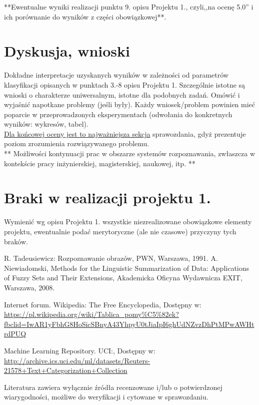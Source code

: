 \documentclass{classrep}
\begin{document}
{**Ewentualne wyniki realizacji punktu 9. opisu Projektu 1., czyli,,na ocenę 5.0'' i ich porównanie do wyników z
części obowiązkowej**.}\\



\section{Dyskusja, wnioski}
Dokładne interpretacje uzyskanych wyników w zależności od parametrów klasyfikacji
opisanych w punktach 3.-8 opisu Projektu 1. 
Szczególnie istotne są wnioski o charakterze uniwersalnym, istotne dla podobnych zadań. 
Omówić i wyjaśnić napotkane problemy (jeśli były). Każdy wniosek/problem powinien mieć poparcie
w przeprowadzonych eksperymentach (odwołania do konkretnych wyników: wykresów,
tabel). \\
\underline{Dla końcowej oceny jest to najważniejsza sekcja} sprawozdania, gdyż prezentuje poziom
zrozumienia rozwiązywanego problemu.\\

** Możliwości kontynuacji prac w obszarze systemów rozpoznawania, zwłaszcza w kontekście pracy inżynierskiej,
magisterskiej, naukowej, itp. **\\



\section{Braki w realizacji projektu 1.}
Wymienić wg opisu Projektu 1. wszystkie niezrealizowane obowiązkowe elementy projektu, ewentualnie
podać merytoryczne (ale nie czasowe) przyczyny tych braków. 


\begin{thebibliography}{0}
 R. Tadeusiewicz: Rozpoznawanie obrazów, PWN, Warszawa, 1991.  
 A. Niewiadomski, Methods for the Linguistic Summarization of Data: Applications of Fuzzy Sets and Their Extensions, Akademicka Oficyna Wydawnicza EXIT, Warszawa, 2008.

 Internet forum. Wikipedia: The Free Encyclopedia, Dostępny w: \url{https://pl.wikipedia.org/wiki/Tablica_pomy%C5%82ek?fbclid=IwAR1yFbhG8HoSicSBnyA43YhpyU0tJiaIpI6ghUdNZvzDhPtMPwAWHtrdPUQ}

 Machine Learning Repository. UCI:, Dostępny w: \url{http://archive.ics.uci.edu/ml/datasets/Reuters-21578+Text+Categorization+Collection}

\end{thebibliography}

Literatura zawiera wyłącznie źródła recenzowane i/lub o potwierdzonej wiarygodności,
możliwe do weryfikacji i cytowane w sprawozdaniu. 
\end{document}
